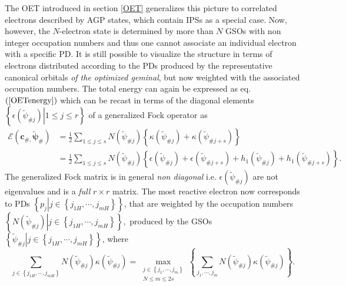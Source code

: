 \documentclass[aps,preprint]{revtex4}%
\begin{document}
The OET introduced in section \ref{OET} generalizes this picture to correlated
electrons described by AGP states, which contain IPSs as a special case. Now,
however, the $N$-electron state is determined by more than $N$ GSOs with non
integer occupation numbers and thus one cannot associate an individual
electron with a specific PD. It is still possible to visualize the structure
in terms of electrons distributed according to the PDs produced by the
representative canonical orbitals \emph{of the optimized geminal}, but now
weighted with the associated occupation numbers. The total energy can again be
expressed as eq. $\left(  \ref{OETenergy}\right)  $ which can be recast in
terms of the diagonal elements $\left\{  \left.  \epsilon\left(  \tilde{\psi
}_{\#j}\right)  \right\vert 1\leq j\leq r\right\}  $ of a generalized Fock
operator\emph{ }\cite{OrtizWeiner2006} as
\begin{align}
\mathcal{E}\left(  \boldsymbol{c}_{\#,}\boldsymbol{\tilde{\psi}}_{\#}\right)
&  =\frac{1}{2}\sum_{1\leq j\leq s}N\left(  \tilde{\psi}_{\#j}\right)
\left\{  \kappa\left(  \tilde{\psi}_{\#j}\right)  +\kappa\left(  \tilde{\psi
}_{\#j+s}\right)  \right\} \nonumber\\
&  =\frac{1}{2}\sum_{1\leq j\leq s}N\left(  \tilde{\psi}_{\#j}\right)
\left\{  \epsilon\left(  \tilde{\psi}_{\#j}\right)  +\epsilon\left(
\tilde{\psi}_{\#j+s}\right)  +h_{1}\left(  \tilde{\psi}_{\#j}\right)
+h_{1}\left(  \tilde{\psi}_{\#j+s}\right)  \right\}  . \label{GenFocken}%
\end{align}
The generalized Fock matrix is in general \emph{non diagonal} i.e.
$\epsilon\left(  \tilde{\psi}_{\#j}\right)  $ are not eigenvalues and is a
\emph{full} $r\times r$ matrix. The most reactive electron now corresponds to
PDs $\left\{  \left.  p_{j}\right\vert j\in\left\{  j_{1H},\cdots
,j_{mH}\right\}  \right\}  $, that are weighted by the occupation numbers
$\left\{  \left.  N\left(  \tilde{\psi}_{\#j}\right)  \right\vert j\in\left\{
j_{1H},\cdots,j_{mH}\right\}  \right\}  ,$ produced by the GSOs $\left\{
\left.  \tilde{\psi}_{\#j}\right\vert j\in\left\{  j_{1H},\cdots
,j_{mH}\right\}  \right\}  $, where
\begin{equation}
\sum_{j\in\left\{  j_{1H},\cdots,j_{mH}\right\}  }N\left(  \tilde{\psi}%
_{\#j}\right)  \kappa\left(  \tilde{\psi}_{\#j}\right)  =\max_{\substack{j\in
\left\{  j_{1},\cdots,j_{m}\right\}  \\N\leq m\leq2s}}\left\{  \sum
_{j_{1},\cdots,j_{m}}N\left(  \tilde{\psi}_{\#j}\right)  \kappa\left(
\tilde{\psi}_{\#j}\right)  \right\}  .
\end{equation}
\end{document}
